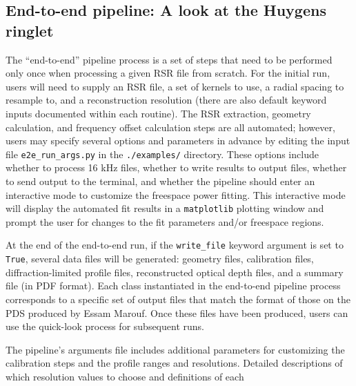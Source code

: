 \documentclass[titlepage, 12pt]{article}
\begin{document}
        \subsection{End-to-end pipeline: A look at the Huygens ringlet}
            \label{sec:end2end}
            The ``end-to-end'' pipeline process is a set
            of steps that need to be performed only once
            when processing a given RSR file from scratch.
            For the initial run, users will need
            to supply an RSR file, a set of kernels to use,
            a radial spacing to resample to, and a 
            reconstruction resolution (there are also default
            keyword inputs documented within each routine).
            The RSR extraction, geometry calculation, and frequency
            offset calculation steps are all automated; however,
            users may specify several options and parameters
            in advance by editing the input file \texttt{e2e\_run\_args.py}
            in the \texttt{./examples/} directory. These options
            include whether to process 16 kHz files, whether to write
            results to output files, whether to send output to the terminal,
            and whether the pipeline should enter
            an interactive mode to customize the freespace power
            fitting. This interactive mode will display the automated
            fit results in a \texttt{matplotlib} plotting window and
            prompt the user for changes to the fit parameters
            and/or freespace regions.
            \par\hfill\par
            At the end of the end-to-end run, if the \texttt{write\_file}
            keyword argument is set to \texttt{True}, several data files will
            be generated: geometry files, calibration files,
            diffraction-limited profile files, reconstructed optical
            depth files, and a summary file (in PDF format). Each class instantiated in
            the end-to-end pipeline process corresponds to a specific set
            of output files that match the format of those on the PDS produced by Essam Marouf. Once these files
            have been produced, users can use the quick-look process for
            subsequent runs.
            \par\hfill\par
            The pipeline's arguments file includes additional parameters for customizing the calibration steps
            and the profile ranges and resolutions. Detailed descriptions of which resolution values to choose and definitions of each
\end{document}
